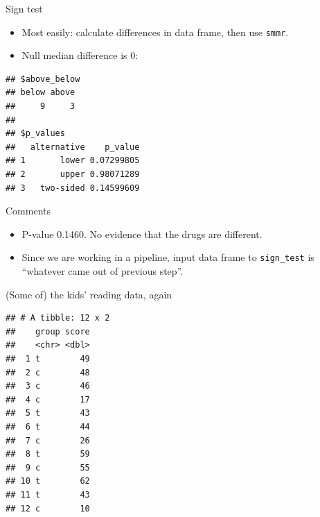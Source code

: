 \documentclass[
  ignorenonframetext,
]{beamer}
\newenvironment{Shaded}{\begin{snugshade}}{\end{snugshade}}
\newcommand{\DataTypeTok}[1]{\textcolor[rgb]{0.13,0.29,0.53}{#1}}
\newcommand{\DecValTok}[1]{\textcolor[rgb]{0.00,0.00,0.81}{#1}}
\newcommand{\KeywordTok}[1]{\textcolor[rgb]{0.13,0.29,0.53}{\textbf{#1}}}
\newcommand{\NormalTok}[1]{#1}
\newcommand{\OperatorTok}[1]{\textcolor[rgb]{0.81,0.36,0.00}{\textbf{#1}}}
\newcommand{\StringTok}[1]{\textcolor[rgb]{0.31,0.60,0.02}{#1}}
\providecommand{\tightlist}{%
  \setlength{\itemsep}{0pt}\setlength{\parskip}{0pt}}
\begin{document}
\begin{frame}[fragile]{Sign test}
\protect\hypertarget{sign-test}{}

\begin{itemize}
\tightlist
\item
  Most easily: calculate differences in data frame, then use
  \texttt{smmr}.
\item
  Null median difference is 0:
\end{itemize}

\begin{Shaded}
\end{Shaded}

\begin{verbatim}
## $above_below
## below above 
##     9     3 
## 
## $p_values
##   alternative    p_value
## 1       lower 0.07299805
## 2       upper 0.98071289
## 3   two-sided 0.14599609
\end{verbatim}

\end{frame}

\begin{frame}[fragile]{Comments}
\protect\hypertarget{comments-7}{}

\begin{itemize}
\tightlist
\item
  P-value 0.1460. No evidence that the drugs are different.
\item
  Since we are working in a pipeline, input data frame to
  \texttt{sign\_test} is ``whatever came out of previous step''.
\end{itemize}

\end{frame}

\begin{frame}[fragile]{(Some of) the kids' reading data, again}
\protect\hypertarget{some-of-the-kids-reading-data-again}{}

\begin{Shaded}
\end{Shaded}

\begin{verbatim}
## # A tibble: 12 x 2
##    group score
##    <chr> <dbl>
##  1 t        49
##  2 c        48
##  3 c        46
##  4 c        17
##  5 t        43
##  6 t        44
##  7 c        26
##  8 t        59
##  9 c        55
## 10 t        62
## 11 t        43
## 12 c        10
\end{verbatim}

\end{frame}
\end{document}

